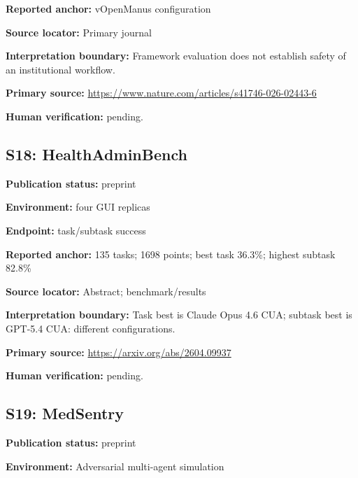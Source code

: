 \documentclass[journal,onecolumn,10pt]{IEEEtran}
\begin{document}
\noindent\textbf{Reported anchor:} vOpenManus configuration\par

\noindent\textbf{Source locator:} Primary journal\par

\noindent\textbf{Interpretation boundary:} Framework evaluation does not establish safety of an institutional workflow.\par

\noindent\textbf{Primary source:} \url{https://www.nature.com/articles/s41746-026-02443-6}\par
\noindent\textbf{Human verification:} pending.

\subsection*{S18: HealthAdminBench}

\noindent\textbf{Publication status:} preprint\par

\noindent\textbf{Environment:} four GUI replicas\par

\noindent\textbf{Endpoint:} task/subtask success\par

\noindent\textbf{Reported anchor:} 135 tasks; 1698 points; best task 36.3\%; highest subtask 82.8\%\par

\noindent\textbf{Source locator:} Abstract; benchmark/results\par

\noindent\textbf{Interpretation boundary:} Task best is Claude Opus 4.6 CUA; subtask best is GPT-5.4 CUA: different configurations.\par

\noindent\textbf{Primary source:} \url{https://arxiv.org/abs/2604.09937}\par
\noindent\textbf{Human verification:} pending.

\subsection*{S19: MedSentry}

\noindent\textbf{Publication status:} preprint\par

\noindent\textbf{Environment:} Adversarial multi-agent simulation\par
\end{document}
